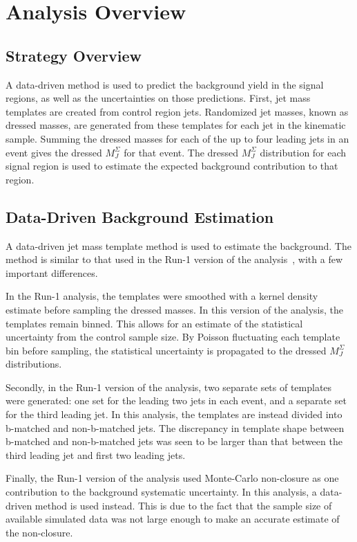 \chapter{Analysis Overview}\label{ch:analysis_overview}

\section{Strategy Overview}\label{sec:overview}

A data-driven method is used to predict the background yield in the signal regions, as well as the uncertainties on those predictions.
First, jet mass templates are created from control region jets.
Randomized jet masses, known as dressed masses, are generated from these templates for each jet in the kinematic sample.
Summing the dressed masses for each of the up to four leading jets in an event gives the dressed $M_{J}^{\Sigma}$ for that event.
The dressed $M_{J}^{\Sigma}$ distribution for each signal region is used to estimate the expected background contribution to that region.

\section{Data-Driven Background Estimation} \label{sec:bkg_estimation}
A data-driven jet mass template method is used to estimate the background.
The method is similar to that used in the Run-1 version of the analysis~\cite{run1-multijet}, with a few important differences.

In the Run-1 analysis, the templates were smoothed with a kernel density estimate before sampling the dressed masses.
In this version of the analysis, the templates remain binned.
This allows for an estimate of the statistical uncertainty from the control sample size.
By Poisson fluctuating each template bin before sampling, the statistical uncertainty is propagated to the dressed $M_J^{\Sigma}$ distributions.

Secondly, in the Run-1 version of the analysis, two separate sets of templates were generated: one set for the leading two jets in each event,
and a separate set for the third leading jet.
In this analysis, the templates are instead divided into b-matched and non-b-matched jets.
The discrepancy in template shape between b-matched and non-b-matched jets was seen to be larger than that between the third leading jet and first two leading jets.

Finally, the Run-1 version of the analysis used Monte-Carlo non-closure as one contribution to the background systematic uncertainty.
In this analysis, a data-driven method is used instead.
This is due to the fact that the sample size of available simulated data was not large enough to make an accurate estimate of the non-closure.
